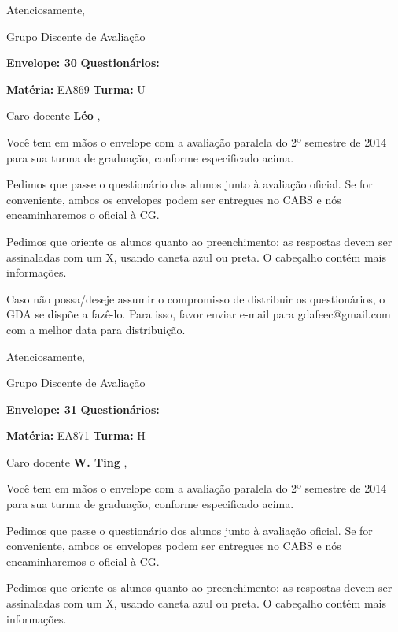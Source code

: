\documentclass[a5paper]{letter}
\begin{document}
Atenciosamente, 

Grupo Discente de Avaliação

\vspace{0.5cm}

{\bf Envelope: 30 }		\hfill	{\bf Questionários:} \hspace{2cm}

\newpage
\thispagestyle{empty}

\hfill {\bf Matéria:} EA869 {\bf Turma:} U

Caro docente {\bf Léo }, 

	Você tem em mãos o envelope com a avaliação paralela do 2º semestre de 2014 para sua turma de graduação, conforme especificado acima.

	Pedimos que passe o questionário dos alunos junto à avaliação oficial. Se for conveniente, ambos os envelopes podem ser entregues no CABS e nós encaminharemos o oficial à CG.

Pedimos que oriente os alunos quanto ao preenchimento: as respostas devem ser assinaladas com um X, usando caneta azul ou preta. O cabeçalho contém mais informações.

	Caso não possa/deseje assumir o compromisso de distribuir os questionários, o GDA se dispõe a fazê-lo. Para isso, favor enviar e-mail para gdafeec@gmail.com com a melhor data para distribuição.


Atenciosamente, 

Grupo Discente de Avaliação

\vspace{0.5cm}

{\bf Envelope: 31 }		\hfill	{\bf Questionários:} \hspace{2cm}

\newpage
\thispagestyle{empty}

\hfill {\bf Matéria:} EA871 {\bf Turma:} H

Caro docente {\bf W. Ting }, 

	Você tem em mãos o envelope com a avaliação paralela do 2º semestre de 2014 para sua turma de graduação, conforme especificado acima.

	Pedimos que passe o questionário dos alunos junto à avaliação oficial. Se for conveniente, ambos os envelopes podem ser entregues no CABS e nós encaminharemos o oficial à CG.

Pedimos que oriente os alunos quanto ao preenchimento: as respostas devem ser assinaladas com um X, usando caneta azul ou preta. O cabeçalho contém mais informações.
\end{document}
